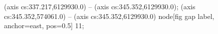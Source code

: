  (axis cs:337.217,6129930.0) -- (axis cs:345.352,6129930.0);
 (axis cs:345.352,574061.0) -- (axis cs:345.352,6129930.0)
  node[fig gap label, anchor=east, pos=0.5] {\texttimes{}11};
